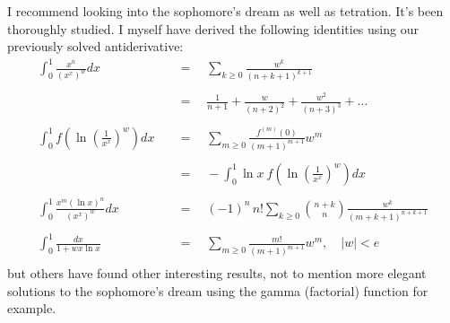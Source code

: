 \documentclass[twoside]{article}
\begin{document}
I recommend looking into the sophomore's dream as well as tetration. It's been thoroughly studied.
I myself have derived the following identities using our previously solved antiderivative:
\begin{align*}
\int_0^1\frac{x^n}{(x^x)^w}dx			& \quad=\quad \sum_{k\ge 0}\frac{w^k}{(n+k+1)^{k+1}}				\\
																\\
						& \quad=\quad \frac{1}{n+1}+\frac{w}{(n+2)^2}+\frac{w^2}{(n+3)^3}+\ldots	\\
																\\
\int_0^1f(\ln\left(\frac{1}{x^x}\right)^w)dx	& \quad=\quad \sum_{m\ge 0}\frac{f^{(m)}(0)}{(m+1)^{m+1}}w^m			\\
																\\
						& \quad=\quad -\int_0^1\ln x\ f(\ln\left(\frac{1}{x^x}\right)^w)dx		\\
																\\
\int_0^1\frac{x^m(\ln x)^n}{(x^x)^w}dx		& \quad=\quad (-1)^n\,n!\sum_{k\ge 0}{n+k\choose n}\frac{w^k}{(m+k+1)^{n+k+1}}	\\
																\\
\int_0^1\frac{dx}{1+wx\ln x}			& \quad=\quad \sum_{m\ge 0}\frac{m!}{(m+1)^{m+1}}w^m,\quad |w| < e		\\
\end{align*}
but others have found other interesting results, not to mention more elegant solutions to the sophomore's dream using the
gamma (factorial) function for example.
\end{document}
